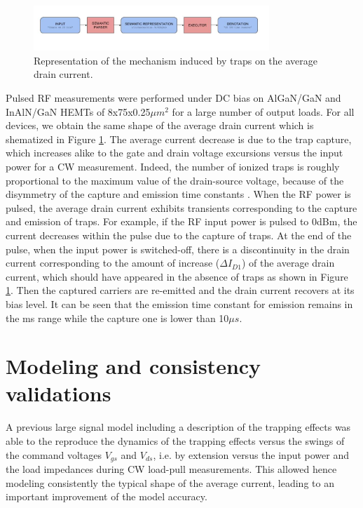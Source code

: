 \documentclass[conference]{IEEEtran}
\begin{document}
\begin{figure}[ht!] %
\centering
\includegraphics[width=3.5in]{gb-1.jpg}
\caption{Representation of the mechanism induced by traps on the average drain current.}
\label{Courant_2}
\end{figure}

Pulsed RF measurements were performed under DC bias on  AlGaN/GaN and InAlN/GaN HEMTs of 8x75x0.25$\mu m^2$ for a large number of output loads. For all devices, we obtain the same shape of the average drain current which is shematized in Figure \ref{Courant_2}. The average current decrease is due to the trap capture, which increases alike to the gate and drain voltage excursions versus the input power for a CW measurement. Indeed, the number of ionized traps is roughly proportional to the maximum value of the drain-source voltage, because of the disymmetry of the capture and emission time constants \cite{163456}.  When the RF power is pulsed, the average drain current exhibits transients  corresponding to the capture and emission of traps. For example, if the RF input power is pulsed to 0dBm, the current decreases  within the pulse due to the capture of traps. At the end of the pulse, when the input power is switched-off, there is a discontinuity in the drain current corresponding to the amount of increase ($\Delta I_{D1}$) of the average drain current, which should have appeared in the absence of traps as shown in Figure \ref{Courant_2}. Then the captured carriers are re-emitted and the drain current recovers at its bias level. It can be seen that the emission time constant for emission remains in the ms range while the capture one is lower than 10$\mu s$.



\section{Modeling and consistency validations}

A previous large signal model including a description of the trapping effects \cite{Jardel2007b} was able to the reproduce the dynamics of the trapping effects versus the swings of the command voltages $V_{gs}$ and $V_{ds}$, i.e. by extension versus the input power and the load impedances during CW load-pull measurements. This allowed hence modeling consistently the typical shape of the average current, leading to an important improvement of the model accuracy. 
\end{document}
